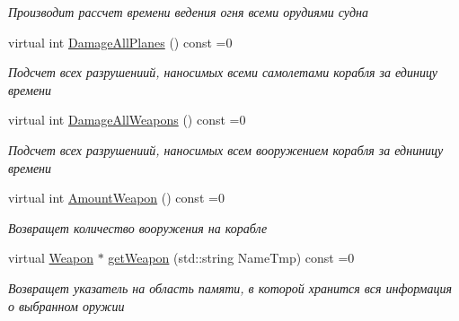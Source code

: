 \begin{DoxyCompactItemize}
\begin{DoxyCompactList}\small\item\em Производит рассчет времени ведения огня всеми орудиями судна \end{DoxyCompactList}\item 
\mbox{\label{class_aircraft_carrier_group_1_1_ship_a2731c146c8edfc3a799661d249ccf522}} 
virtual int \mbox{\hyperlink{class_aircraft_carrier_group_1_1_ship_a2731c146c8edfc3a799661d249ccf522}{Damage\+All\+Planes}} () const =0
\begin{DoxyCompactList}\small\item\em Подсчет всех разрушениий, наносимых всеми самолетами корабля за единицу времени \end{DoxyCompactList}\item 
\mbox{\label{class_aircraft_carrier_group_1_1_ship_a025ad4bfa82e6ff5539d53ab899bd37f}} 
virtual int \mbox{\hyperlink{class_aircraft_carrier_group_1_1_ship_a025ad4bfa82e6ff5539d53ab899bd37f}{Damage\+All\+Weapons}} () const =0
\begin{DoxyCompactList}\small\item\em Подсчет всех разрушениий, наносимых всем вооружением корабля за едниницу времени \end{DoxyCompactList}\item 
\mbox{\label{class_aircraft_carrier_group_1_1_ship_ab082a4331c038ece44b7304b7d3c212c}} 
virtual int \mbox{\hyperlink{class_aircraft_carrier_group_1_1_ship_ab082a4331c038ece44b7304b7d3c212c}{Amount\+Weapon}} () const =0
\begin{DoxyCompactList}\small\item\em Возвращет количество вооружения на корабле \end{DoxyCompactList}\item 
virtual \mbox{\hyperlink{class_aircraft_carrier_group_1_1_weapon}{Weapon}} $\ast$ \mbox{\hyperlink{class_aircraft_carrier_group_1_1_ship_a8ac6e8e9ed4f997a5f02fda7e049cd6d}{get\+Weapon}} (std\+::string Name\+Tmp) const =0
\begin{DoxyCompactList}\small\item\em Возвращет указатель на область памяти, в которой хранится вся информация о выбранном оружии \end{DoxyCompactList}\item 

\end{DoxyCompactItemize}
